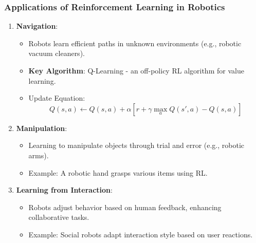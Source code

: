 \documentclass[aspectratio=169]{beamer}
\begin{document}
\begin{frame}[fragile]
    \frametitle{Applications of Reinforcement Learning in Robotics}
    \begin{enumerate}
        \item \textbf{Navigation}:
            \begin{itemize}
                \item Robots learn efficient paths in unknown environments (e.g., robotic vacuum cleaners).
                \item \textbf{Key Algorithm}: Q-Learning - an off-policy RL algorithm for value learning.
                \item Update Equation: 
                \begin{equation}
                    Q(s, a) \leftarrow Q(s, a) + \alpha \left[ r + \gamma \max_a Q(s', a) - Q(s, a) \right]
                \end{equation}
            \end{itemize}
        
        \item \textbf{Manipulation}:
            \begin{itemize}
                \item Learning to manipulate objects through trial and error (e.g., robotic arms).
                \item Example: A robotic hand grasps various items using RL.
            \end{itemize}
        
        \item \textbf{Learning from Interaction}:
            \begin{itemize}
                \item Robots adjust behavior based on human feedback, enhancing collaborative tasks.
                \item Example: Social robots adapt interaction style based on user reactions.
            \end{itemize}
    \end{enumerate}
\end{frame}
\end{document}
